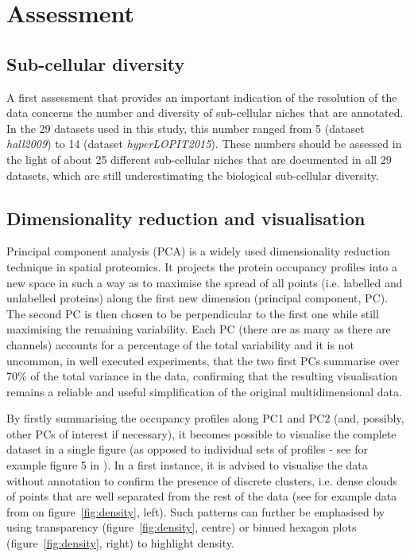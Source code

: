 \documentclass[12pt]{article}\usepackage[]{graphicx}\usepackage[]{color}
\begin{document}
\section{Assessment}

\subsection{Sub-cellular diversity}\label{sec:sub-cell-divers}

A first assessment that provides an important indication of the
resolution of the data concerns the number and diversity of
sub-cellular niches that are annotated. In the 29
datasets used in this study, this number ranged from
5 (dataset
\textit{hall2009}) to
14 (dataset
\textit{hyperLOPIT2015}). These numbers should be
assessed in the light of about 25 different sub-cellular niches that
are documented in all 29 datasets, which are still
underestimating the biological sub-cellular diversity.

\subsection{Dimensionality reduction and visualisation}\label{sec:vis}

Principal component analysis (PCA) is a widely used dimensionality
reduction technique in spatial proteomics. It projects the protein
occupancy profiles into a new space in such a way as to maximise the
spread of all points (i.e. labelled and unlabelled proteins) along the
first new dimension (principal component, PC). The second PC is then
chosen to be perpendicular to the first one while still maximising the
remaining variability. Each PC (there are as many as there are
channels) accounts for a percentage of the total variability and it is
not uncommon, in well executed experiments, that the two first PCs
summarise over 70\% of the total variance in the data, confirming that
the resulting visualisation remains a reliable and useful
simplification of the original multidimensional data.

By firstly summarising the occupancy profiles along PC1 and PC2 (and,
possibly, other PCs of interest if necessary), it becomes
possible to visualise the complete dataset in a single figure (as
opposed to individual sets of profiles - see for example figure 5 in
\citet{Gatto:2010}). In a first instance, it is advised to visualise
the data without annotation to confirm the presence of discrete
clusters, i.e. dense clouds of points that are well separated from the
rest of the data (see for example data from \citet{Christoforou:2016}
on figure~\ref{fig:density}, left). Such patterns can further be
emphasised by using transparency (figure~\ref{fig:density}, centre) or
binned hexagon plots (figure~\ref{fig:density}, right) to highlight
density.
\end{document}
